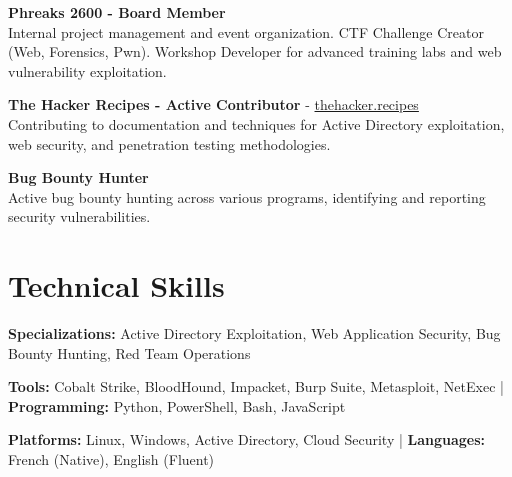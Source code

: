 \documentclass[11pt,a4paper]{article}
\begin{document}
\textbf{Phreaks 2600 - Board Member} \\
Internal project management and event organization. CTF Challenge Creator (Web, Forensics, Pwn). Workshop Developer for advanced training labs and web vulnerability exploitation.

\textbf{The Hacker Recipes - Active Contributor} - \href{https://thehacker.recipes}{thehacker.recipes} \\
Contributing to documentation and techniques for Active Directory exploitation, web security, and penetration testing methodologies.

\textbf{Bug Bounty Hunter} \\
Active bug bounty hunting across various programs, identifying and reporting security vulnerabilities.

\section{Technical Skills}

\textbf{Specializations:} Active Directory Exploitation, Web Application Security, Bug Bounty Hunting, Red Team Operations

\textbf{Tools:} Cobalt Strike, BloodHound, Impacket, Burp Suite, Metasploit, NetExec | \textbf{Programming:} Python, PowerShell, Bash, JavaScript

\textbf{Platforms:} Linux, Windows, Active Directory, Cloud Security | \textbf{Languages:} French (Native), English (Fluent)
\end{document}
